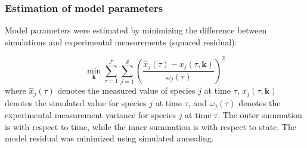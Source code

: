 \documentclass[10pt,twocolumn,twoside,final]{IEEEtran}
\begin{document}
\subsubsection*{Estimation of model parameters}
Model parameters were estimated by minimizing the difference between simulations and experimental measurements (squared residual):

\begin{equation}\label{eqn:objective-function}
	\min_{\mathbf{k}} \sum_{\tau=1}^{\mathcal{T}}\sum_{j=1}^{\mathcal{S}}\left(\frac{\hat{x}_{j}\left(\tau\right) - x_{j}\left(\tau,\mathbf{k}\right)}{\omega_{j}\left(\tau\right)}\right)^{2}
\end{equation}
where $\hat{x}_{j}\left(\tau\right)$ denotes the measured value of species $j$ at time $\tau$, $x_{j}\left(\tau,\mathbf{k}\right)$ denotes the simulated
value for species $j$ at time $\tau$, and $\omega_{j}\left(\tau\right)$ denotes the experimental measurement variance for species $j$ at time $\tau$.
The outer summation is with respect to time, while the inner summation is with respect to state. The model residual was minimized using simulated annealing.



\end{document}
